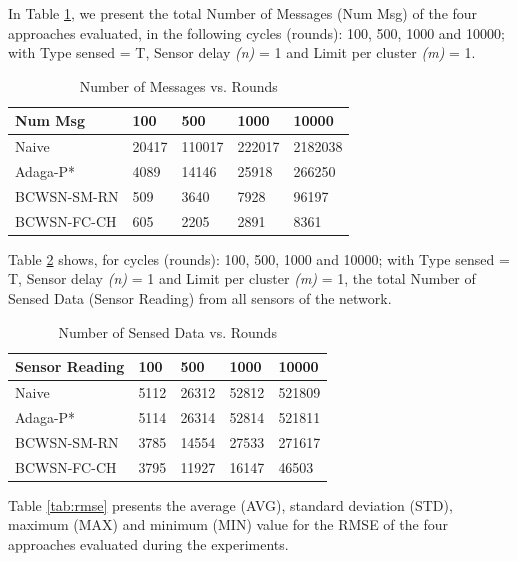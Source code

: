 \documentclass[conference]{IEEEtran}
\begin{document}
In Table \ref{tab:numMsgVsRounds}, we present the total Number of Messages (Num Msg)
of the four approaches evaluated, in the following cycles (rounds): 100, 500,
1000 and 10000; with Type sensed = T, Sensor delay {\it(n)} = 1 and Limit per
cluster {\it(m)} = 1.

\begin{table}[h!]
\caption{Number of Messages vs. Rounds}
\label{tab:numMsgVsRounds}
\begin{center}
\begin{tabular}{|l||l|l|l|l|}
\hline
Num Msg &100 &500 &1000 &10000 \\
\hline\hline
Naive &20417 &110017 &222017 &2182038 \\
\hline
Adaga-P* &4089 &14146 &25918 &266250 \\
\hline
BCWSN-SM-RN &509 &3640 &7928 &96197 \\
\hline
BCWSN-FC-CH &605 &2205 &2891 &8361 \\
\hline
\end{tabular}
\end{center}
\end{table}

Table \ref{tab:sensReadVsRounds} shows, for cycles (rounds): 100, 500, 1000 and
10000; with Type sensed = T, Sensor delay {\it(n)} = 1 and Limit per cluster
{\it(m)} = 1, the total Number of Sensed Data (Sensor Reading) from all sensors
of the network.

\begin{table}[h!]
\caption{Number of Sensed Data vs. Rounds}
\label{tab:sensReadVsRounds}
\begin{center}
\begin{tabular}{|l||l|l|l|l|}
\hline
Sensor Reading &100 &500 &1000 &10000 \\
\hline\hline
Naive &5112 &26312 &52812 &521809 \\
\hline
Adaga-P* &5114 &26314 &52814 &521811 \\
\hline
BCWSN-SM-RN &3785 &14554 &27533 &271617 \\
\hline
BCWSN-FC-CH &3795 &11927 &16147 &46503 \\
\hline
\end{tabular}
\end{center}
\end{table}





Table \ref{tab:rmse} presents the average (AVG), standard deviation (STD),
maximum (MAX) and minimum (MIN) value for the RMSE of the four approaches
evaluated during the experiments.
\end{document}
